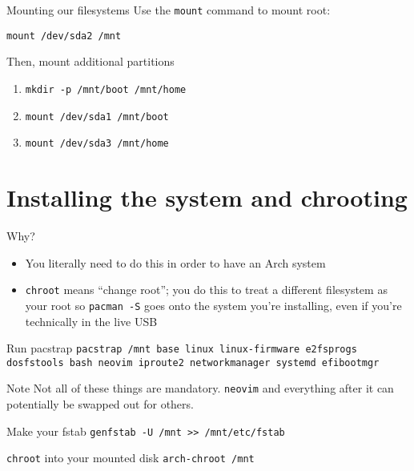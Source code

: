 \documentclass{beamer}
\begin{document}
\begin{frame}{Mounting our filesystems}
    Use the \texttt{mount} command to mount root:

    \texttt{mount /dev/sda2 /mnt}

    Then, mount additional partitions
    \begin{enumerate}
        \item \texttt{mkdir -p /mnt/boot /mnt/home}
        \item \texttt{mount /dev/sda1 /mnt/boot}
        \item \texttt{mount /dev/sda3 /mnt/home}
    \end{enumerate}
\end{frame}

\section{Installing the system and chrooting}

\begin{frame}{Why?}
    \begin{itemize}
        \item You literally need to do this in order to have an Arch system
        \item \texttt{chroot} means ``change root''; you do this to treat a different filesystem as your root so \texttt{pacman -S} goes onto the system you're installing, even if you're technically in the live USB
    \end{itemize}
\end{frame}

\begin{frame}{Run pacstrap}
    \texttt{pacstrap /mnt base linux linux-firmware e2fsprogs dosfstools bash neovim iproute2 networkmanager systemd efibootmgr}

    \begin{alertblock}{Note}
        Not all of these things are mandatory. \texttt{neovim} and everything after it can potentially be swapped out for others.
    \end{alertblock}
\end{frame}

\begin{frame}{Make your fstab}
    \texttt{genfstab -U /mnt >> /mnt/etc/fstab}
\end{frame}

\begin{frame}{\texttt{chroot} into your mounted disk}
    \texttt{arch-chroot /mnt}
\end{frame}
\end{document}
